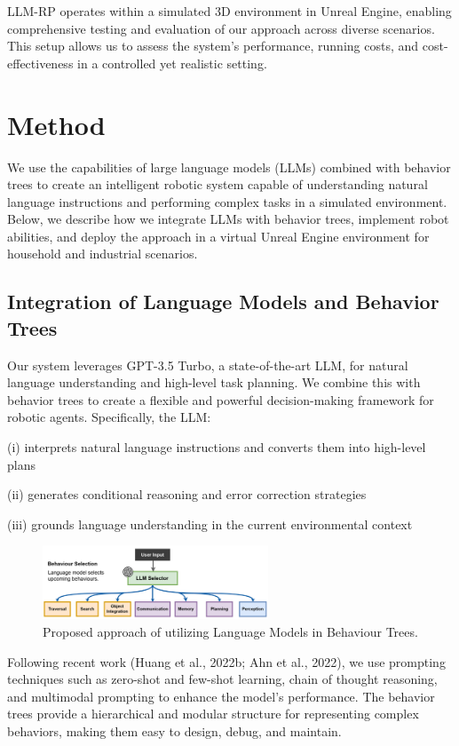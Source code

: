 \documentclass[pdflatex,sn-mathphys-num]{sn-jnl}%
\theoremstyle{thmstyleone}
\theoremstyle{thmstyletwo}%
\theoremstyle{thmstylethree}%
\begin{document}
LLM-RP operates within a simulated 3D environment in Unreal Engine, enabling comprehensive testing and evaluation of our approach across diverse scenarios. This setup allows us to assess the system's performance, running costs, and cost-effectiveness in a controlled yet realistic setting.


\section{Method}
We use the capabilities of large language models (LLMs) combined with behavior trees to create an intelligent robotic system capable of understanding natural language instructions and performing complex tasks in a simulated environment. Below, we describe how we integrate LLMs with behavior trees, implement robot abilities, and deploy the approach in a virtual Unreal Engine environment for household and industrial scenarios.

\subsection{Integration of Language Models and Behavior Trees}
Our system leverages GPT-3.5 Turbo, a state-of-the-art LLM, for natural language understanding and high-level task planning. We combine this with behavior trees to create a flexible and powerful decision-making framework for robotic agents. Specifically, the LLM:

(i) interprets natural language instructions and converts them into high-level plans

(ii) generates conditional reasoning and error correction strategies

(iii) grounds language understanding in the current environmental context

\begin{figure}[H]
\centering
\includegraphics[width=0.6\textwidth]{figures/Picture12.png}
\caption{Proposed approach of utilizing Language Models in Behaviour Trees.}\label{fig7}
\end{figure}
Following recent work (Huang et al., 2022b; Ahn et al., 2022), we use prompting techniques such as zero-shot and few-shot learning, chain of thought reasoning, and multimodal prompting to enhance the model's performance. The behavior trees provide a hierarchical and modular structure for representing complex behaviors, making them easy to design, debug, and maintain.
\end{document}
